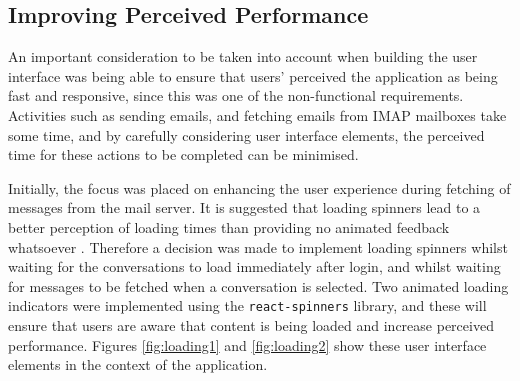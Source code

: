 \subsection{Improving Perceived Performance} %
An important consideration to be taken into account when building the user interface was being able to ensure that users' perceived the application as being fast and responsive, since this was one of the non-functional requirements. Activities such as sending emails, and fetching emails from IMAP mailboxes take some time, and by carefully considering user interface elements, the perceived time for these actions to be completed can be minimised.

Initially, the focus was placed on enhancing the user experience during fetching of messages from the mail server. It is suggested that loading spinners lead to a better perception of loading times than providing no animated feedback whatsoever \cite{persson2019improving}. Therefore a decision was made to implement loading spinners whilst waiting for the conversations to load immediately after login, and whilst waiting for messages to be fetched when a conversation is selected. Two animated loading indicators were implemented using the \verb|react-spinners| library, and these will ensure that users are aware that content is being loaded and increase perceived performance. Figures \ref{fig:loading1} and \ref{fig:loading2} show these user interface elements in the context of the application.

